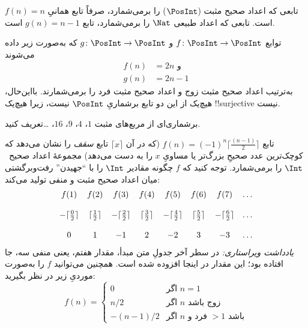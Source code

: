 \documentclass[../../../include/open-logic-section]{subfiles}
\begin{document}
\begin{ex}
تابعی که اعداد صحیح مثبت ($\PosInt$) را برمی‌شمارد، صرفاً تابع همانیِ
$f(n) = n$ است. تابعی که اعداد طبیعی $\Nat$ را برمی‌شمارد، تابع
$g(n) = n - 1$ است.
\end{ex}

\begin{ex}
توابع $f\colon \PosInt \to \PosInt$ و $g \colon \PosInt \to
\PosInt$ که به‌صورت زیر داده می‌شوند
\begin{align*}
f(n) & = 2n \text{ و}\\
g(n) & = 2n - 1
\end{align*}
به‌ترتیب اعداد صحیح مثبت زوج و اعداد صحیح مثبت فرد را برمی‌شمارند.
بااین‌حال، هیچ‌یک از این دو تابع برشماریِ $\PosInt$ نیست، زیرا هیچ‌یک
!!{surjective} نیست.
\end{ex}

\begin{prob}
برشماری‌ای از مربع‌های مثبت $1$، $4$، $9$، $16$، \dots تعریف کنید.
\end{prob}

\begin{ex}
تابع $f(n) = (-1)^{n} \lceil \frac{(n-1)}{2}\rceil$ (که در آن
$\lceil x \rceil$ تابع \emph{سقف} را نشان می‌دهد که کوچک‌ترین عدد صحیحِ بزرگ‌تر یا مساویِ $x$ را
به دست می‌دهد) مجموعهٔ اعداد صحیح~$\Int$ را
برمی‌شمارد. توجه کنید که $f$ چگونه مقادیر $\Int$ را با ``جهیدن'' رفت‌وبرگشتی
میان اعداد صحیح مثبت و منفی تولید می‌کند:
\[
\begin{array}{c c c c c c c c}
f(1) & f(2) & f(3) & f(4) & f(5) & f(6) & f(7) & \dots \\ \\
- \lceil \tfrac{0}{2} \rceil & \lceil \tfrac{1}{2}\rceil & - \lceil \tfrac{2}{2} \rceil & \lceil \tfrac{3}{2} \rceil & - \lceil \tfrac{4}{2} \rceil  & \lceil \tfrac{5}{2}
\rceil & - \lceil \tfrac{6}{2} \rceil & \dots \\ \\
0 & 1 & -1 & 2 & -2 & 3 & -3 & \dots
\end{array}
\]
\emph{یادداشت ویراستاری:} در سطر آخر جدولِ متن مبدأ، مقدار هفتم، یعنی منفی سه،
جا افتاده بود؛ این مقدار در اینجا افزوده شده است.
همچنین می‌توانید $f$ را به‌صورت موردیِ زیر در نظر بگیرید:
\[
f(n) = \begin{cases}
  0 & \text{اگر $n = 1$}\\
  n/2 & \text{اگر $n$ زوج باشد}\\
  -(n-1)/2 & \text{اگر $n$ فرد و $>1$ باشد}
  \end{cases}
\]
\end{ex}
\end{document}
